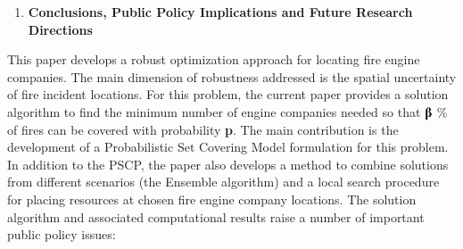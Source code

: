 \documentclass{article} %
\begin{document}
\begin{enumerate}
\item  \textbf{Conclusions, Public Policy Implications and Future Research Directions}
\end{enumerate}

\noindent This paper develops a robust optimization approach for locating fire engine companies.  The main dimension of robustness addressed is the spatial uncertainty of fire incident locations.  For this problem, the current paper provides a solution algorithm to find the minimum number of engine companies needed so that \textbf{$\boldsymbol{\betaup}$} \% of fires can be covered with probability \textbf{p}.  The main contribution is the development of a Probabilistic Set Covering Model formulation for this problem.  In addition to the PSCP, the paper also develops a method to combine solutions from different scenarios (the Ensemble algorithm) and a local search procedure for placing resources at chosen fire engine company locations.  The solution algorithm and associated computational results raise a number of important public policy issues:
\end{document}
